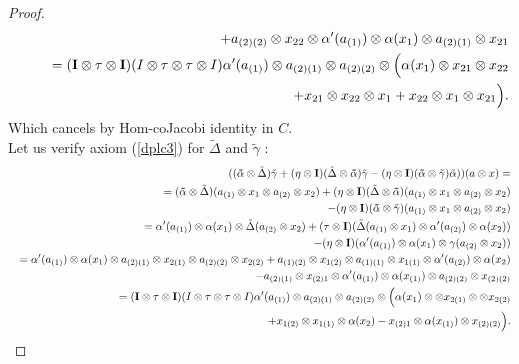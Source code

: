 \documentclass{article}
\theoremstyle{definition}
\theoremstyle{remark}
\numberwithin{equation}{section}
\begin{document}
\begin{proof}
\begin{eqnarray}
&&\qquad\quad+a_{(2)(2)}\otimes x_{22}\otimes \alpha'(a_{(1)})\otimes\alpha(x_{1})\otimes a_{(2)(1)}\otimes x_{21}\nonumber\\
&&\qquad=({\bf I}\otimes \tau\otimes{\bf I})(I\otimes\tau\otimes\tau\otimes I)
\alpha'(a_{(1)})\otimes a_{(2)(1)}\otimes a_{(2)(2)}\otimes\Big(\alpha(x_{1})\otimes x_{21}\otimes x_{22}\nonumber\\
&&\qquad\quad+x_{21}\otimes x_{22}\otimes x_{1}+x_{22}\otimes x_{1}\otimes x_{21}\Big).\nonumber
\end{eqnarray}
Which cancels by Hom-coJacobi identity in $C$.\\
Let us verify axiom (\ref{dplc3}) for $\tilde\Delta$ and $\tilde\gamma$ :
\begin{eqnarray}
&&\qquad ({\bf (\tilde\alpha}\otimes\tilde\Delta)\tilde\gamma+(\eta\otimes{\bf I} )(\tilde\Delta\otimes {\bf \tilde\alpha})\tilde\gamma
-(\eta\otimes {\bf I})({\bf \tilde\alpha}\otimes\tilde\gamma)\tilde\alpha))(a\otimes x)=\nonumber\\
&&=({\bf \tilde\alpha}\otimes\tilde\Delta)(a_{(1)}\otimes x_{1}\otimes a_{(2)}\otimes x_{2})
+(\eta\otimes {\bf I})(\tilde\Delta\otimes {\bf \tilde\alpha})(a_{(1)}\otimes x_{1}\otimes a_{(2)}\otimes x_{2})\nonumber\\
&&\quad-(\eta\otimes {\bf I})({\bf \tilde\alpha}\otimes\tilde\gamma)(a_{(1)}\otimes x_{1}\otimes a_{(2)}\otimes x_{2})\nonumber\\
&&=\alpha'(a_{(1)})\otimes \alpha(x_{1})\otimes\tilde\Delta(a_{(2)}\otimes x_{2})
+(\tau\otimes {\bf I})(\tilde\Delta(a_{(1)}\otimes x_{1})\otimes \alpha'(a_{(2)})\otimes \alpha(x_{2}))\nonumber\\
&&\quad-(\eta\otimes {\bf I})(\alpha'(a_{(1)})\otimes \alpha(x_{1})\otimes\gamma(a_{(2)}\otimes x_{2}))\nonumber\\
&&=\alpha'(a_{(1)})\otimes\alpha(x_{1})\otimes a_{(2)(1)}\otimes x_{2(1)}\otimes a_{(2)(2)}\otimes x_{2(2)}
+a_{(1)(2)}\otimes x_{1(2)}\otimes a_{(1)(1)}\otimes x_{1(1)}\otimes \alpha'(a_{(2)})\otimes \alpha(x_{2})\nonumber\\
&&\quad-a_{(2)(1)}\otimes x_{(2)1}\otimes \alpha'(a_{(1)})\otimes\alpha(x_{(1)})\otimes a_{(2)(2)}\otimes x_{(2)(2)}\nonumber\\
&&=({\bf I}\otimes \tau\otimes{\bf I})(I\otimes\tau\otimes\tau\otimes I)
\alpha'(a_{(1)})\otimes a_{(2)(1)}\otimes a_{(2)(2)}\otimes\Big(\alpha(x_{1})\otimes \otimes x_{2(1)}\otimes \otimes x_{2(2)}\nonumber\\
&&\quad+x_{1(2)}\otimes x_{1(1)}\otimes \alpha(x_{2})-x_{(2)1}\otimes\alpha(x_{(1)})\otimes x_{(2)(2)}\Big).\nonumber

\end{eqnarray}
\end{proof}
\end{document}
